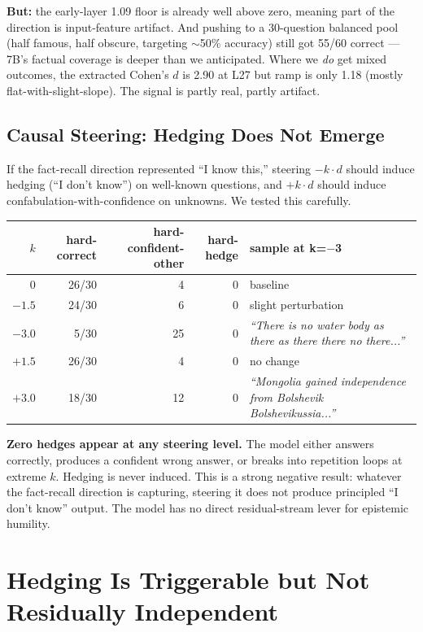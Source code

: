 \documentclass[11pt,a4paper]{article}
\newcommand{\cq}[1]{\textcolor{q}{\textit{``#1''}}}
\begin{document}
\textbf{But:} the early-layer 1.09 floor is already well above zero, meaning part of the direction is input-feature artifact. And pushing to a 30-question balanced pool (half famous, half obscure, targeting $\sim$50\% accuracy) still got 55/60 correct --- 7B's factual coverage is deeper than we anticipated. Where we \emph{do} get mixed outcomes, the extracted Cohen's $d$ is 2.90 at L27 but ramp is only 1.18 (mostly flat-with-slight-slope). The signal is partly real, partly artifact.

\subsection{Causal Steering: Hedging Does Not Emerge}

If the fact-recall direction represented ``I know this,'' steering $-k \cdot d$ should induce hedging (``I don't know'') on well-known questions, and $+k \cdot d$ should induce confabulation-with-confidence on unknowns. We tested this carefully.

\begin{center}
\begin{tabular}{rrrrl}
\toprule
$k$ & hard-correct & hard-confident-other & hard-hedge & sample at k=$-$3 \\
\midrule
$0$ & 26/30 & 4 & 0 & baseline \\
$-1.5$ & 24/30 & 6 & 0 & slight perturbation \\
$-3.0$ & 5/30 & 25 & 0 & \cq{There is no water body as there as there there no there...} \\
$+1.5$ & 26/30 & 4 & 0 & no change \\
$+3.0$ & 18/30 & 12 & 0 & \cq{Mongolia gained independence from Bolshevik Bolshevikussia...} \\
\bottomrule
\end{tabular}
\end{center}

\textbf{Zero hedges appear at any steering level.} The model either answers correctly, produces a confident wrong answer, or breaks into repetition loops at extreme $k$. Hedging is never induced. This is a strong negative result: whatever the fact-recall direction is capturing, steering it does not produce principled ``I don't know'' output. The model has no direct residual-stream lever for epistemic humility.

\section{Hedging Is Triggerable but Not Residually Independent}
\end{document}
